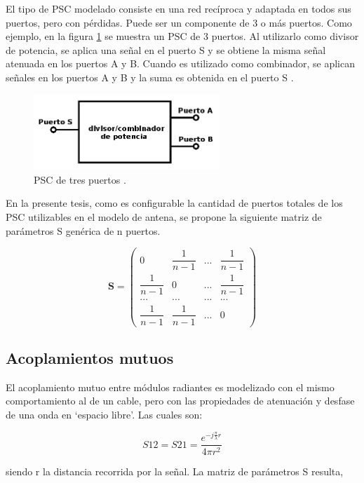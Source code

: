 El tipo de PSC modelado consiste en una red recíproca y adaptada en todos sus puertos, pero con pérdidas. Puede ser un
componente de 3 o más puertos. Como ejemplo, en la figura \ref{fig:3PortsPSC} se muestra un PSC de 3 puertos. Al utilizarlo como
divisor de potencia, se aplica una señal en el puerto S y se obtiene la misma señal atenuada en los puertos A y B. Cuando es
utilizado como combinador, se aplican señales en los puertos A y B y la suma es obtenida en el puerto S \cite{MiniCircuits2015}.

\begin{figure}[H]
 \centering
 \includegraphics[width=7cm]{gfx/3PortsPSC.png}
 \caption{PSC de tres puertos \cite{MiniCircuits2015}.}
 \label{fig:3PortsPSC}
\end{figure}

En la presente tesis, como es configurable la cantidad de puertos totales de los PSC utilizables en el modelo de antena, se 
propone la siguiente matriz de parámetros S genérica de n puertos.

$$
\mathbf{S} = \begin{pmatrix} 0 & \dfrac{1}{n-1} & ... & \dfrac{1}{n-1}\\
							 \dfrac{1}{n-1} & 0 & ... & \dfrac{1}{n-1}\\
							 ... & ... & ... & ... \\
							 \dfrac{1}{n-1} & \dfrac{1}{n-1} & ... & 0 \end{pmatrix}
$$

\subsection{Acoplamientos mutuos}
El acoplamiento mutuo entre módulos radiantes es modelizado con el mismo comportamiento al de un cable, pero con las
propiedades de atenuación y desfase de una onda en \enquote*{espacio libre}. Las cuales son:

\begin{equation}
	S12 = S21 = \dfrac{e^{-j\frac{\pi}{\lambda}r}}{4\pi r^2}
\end{equation}

siendo r la distancia recorrida por la señal. La matriz de parámetros S resulta,

